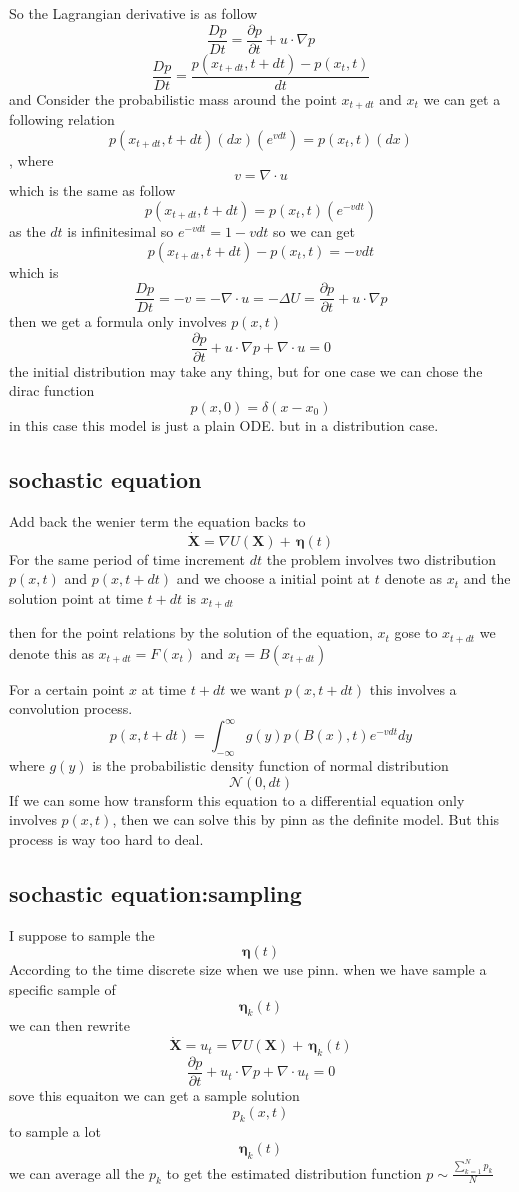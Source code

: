 \documentclass{article}
\theoremstyle{definition} %
\begin{document}
So the Lagrangian derivative
is as follow
\[
    \frac{Dp}{Dt} = \frac{\partial p}{\partial t} + u \cdot \nabla p
\]
\[
    \frac{Dp}{Dt}=\frac{p(x_{t+dt},t+dt)-p(x_{t},t)}{dt}
\]
and Consider the probabilistic mass around the
point \(x_{t+dt}\) and \(x_{t}\) we can get a following
relation
\[p(x_{t+dt},t+dt)(dx)(e^{vdt})=p(x_{t},t)(dx)\],
where \[v=\nabla \cdot u\]
which is the same as follow
\[p(x_{t+dt},t+dt)=p(x_{t},t)(e^{-vdt})\]
as the \(dt\) is infinitesimal so
\(e^{-vdt}=1-vdt\)
so we can get
\[
    p(x_{t+dt},t+dt)-p(x_{t},t)=-vdt
\]
which is
\[
    \frac{Dp}{Dt}=-v=-\nabla \cdot u=-\Delta U=\frac{\partial p}{\partial t} + u \cdot \nabla p
\]
then we get a formula only involves \(p(x,t)\)
\[
    \frac{\partial p}{\partial t} + u \cdot \nabla p +\nabla \cdot u=0
\]
the initial distribution may take any thing,
but for one case we can chose the dirac function
\[
    p(x,0)=\delta(x - x_0)
\]
in this case this model is just a plain
ODE. but in a distribution case.

\subsection{sochastic equation}
Add back the wenier term the equation backs to
\[
    \dot{\mathbf{X}} =  \nabla U(\mathbf{X}) +  \,\boldsymbol{\eta}(t)
\]
For the same period of time increment \(dt\)
the problem involves two distribution
\(p(x,t)\) and \(p(x,t+dt)\)
and we choose a initial point at \(t\)
denote as \(x_t\) and the solution point
at time \(t+dt\) is \(x_{t+dt}\)

then for the point relations by the solution of the
equation, \(x_t\) gose to \(x_{t+dt}\)
we denote this as \(x_{t+dt}=F(x_t)\)
and \(x_{t}=B(x_{t+dt})\)

For a certain point \(x\) at time \(t+dt\)
we want \(p(x,t+dt)\)
this involves a convolution process.
\[
    p(x,t+dt)=\int_{-\infty}^{\infty}g(y)p(B(x),t)e^{-vdt}dy
\]
where $g(y)$ is the probabilistic density function of
normal distribution
\[
    \mathcal{N}(0, dt)
\]
If we can some how transform this equation to a
differential equation only involves
\(p(x,t)\), then we can solve this
by pinn as the definite model.
But this process is way too hard to deal.

\subsection{sochastic equation:sampling}
I suppose to sample the
\[
    \boldsymbol{\eta}(t)
\]
According to the time discrete size when we
use pinn.
when we have sample a specific sample of
\[
    \boldsymbol{\eta}_k(t)
\]
we can then rewrite
\[
    \dot{\mathbf{X}} =  u_t=\nabla U(\mathbf{X}) +  \,\boldsymbol{\eta}_k(t)
\]
\[
    \frac{\partial p}{\partial t} + u_t \cdot \nabla p +\nabla \cdot u_t=0
\]
sove this equaiton we can get a sample solution
\[
    p_k(x,t)
\]
to sample a lot
\[
    \boldsymbol{\eta}_k(t)
\]
we can average all the \(p_k\)
to get the estimated distribution function
\(p\sim\frac{\sum_{k=1}^{N}p_k}{N}\)











\end{document}
